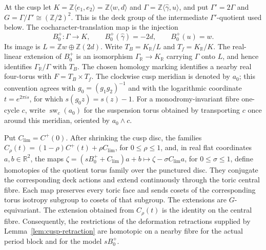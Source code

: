 At the cusp let
$K=\mathbb Z\langle e_1,e_2\rangle
=\mathbb Z\langle w,d\rangle$ and
$\Gamma=\mathbb Z\langle \widehat\gamma,u\rangle$,
and put $\Gamma'=2\Gamma$ and
$G=\Gamma/\Gamma'\cong(\mathbb Z/2)^2$.  This is the deck group of the
intermediate $\Gamma'$-quotient used below.  The cocharacter-translation
map is the injection
\begin{equation}\label{eq:cusp-B-marking}
 B_0^+:\Gamma\longrightarrow K,
 \qquad B_0^+(\widehat\gamma)=-2d,\qquad B_0^+(u)=w.
\end{equation}
Its image is
$L=\mathbb Zw\oplus\mathbb Z(2d)$.  Write
$T_B=K_{\mathbb R}/L$ and $T_f=K_{\mathbb R}/K$.
The real-linear extension of $B_0^+$ is an isomorphism
$\Gamma_{\mathbb R}\to K_{\mathbb R}$ carrying $\Gamma$ onto $L$, and
hence identifies $\Gamma_{\mathbb R}/\Gamma$ with $T_B$.
The chosen homology marking identifies a nearby real four-torus with
$F=T_B\times T_f$.  The
clockwise cusp meridian is denoted by $a_0$; this convention agrees with
$g_0=(g_1g_2)^{-1}$ and with the logarithmic coordinate
$t=e^{2\pi i s}$, for which $s(g_0z)=s(z)-1$.
For a monodromy-invariant fibre one-cycle $c$, write
$\operatorname{sw}_c(a_0)$ for the suspension torus obtained by
transporting $c$ once around this meridian, oriented by
$a_0\wedge c$.

\begin{lemma}
\label{lem:cusp-model-comparison}
Put $C_{\mathrm{lim}}=C^+(0)$.  After shrinking the cusp disc, the families
$C_\rho(t)=(1-\rho)C^+(t)+\rho C_{\mathrm{lim}}$, for
$0\leq\rho\leq1$, and, in real flat coordinates
$a,b\in\mathbb R^2$, the maps
$\zeta=(sB_0^++C_{\mathrm{lim}})a+b\longmapsto
\zeta-\sigma C_{\mathrm{lim}}a$, for $0\leq\sigma\leq1$,
define homotopies of the quotient torus family over the punctured disc.
They conjugate the corresponding deck actions and extend continuously
through the toric central fibre.  Each map preserves every toric face and
sends cosets of the corresponding torus isotropy subgroup to cosets of that
subgroup.  The extensions are $G$-equivariant.  The extension obtained from
$C_\rho(t)$ is the identity on the central fibre.  Consequently, the
restrictions of the
deformation retractions
supplied by
Lemma~\ref{lem:cusp-retraction} are homotopic on a nearby fibre for the actual
period block and for the model $sB_0^+$.
\end{lemma}

